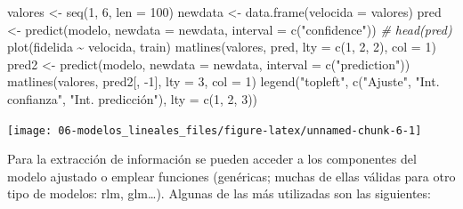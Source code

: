 \documentclass[
  spanish,
]{book}
\newenvironment{Shaded}{\begin{snugshade}}{\end{snugshade}}
\newcommand{\AttributeTok}[1]{\textcolor[rgb]{0.77,0.63,0.00}{#1}}
\newcommand{\CommentTok}[1]{\textcolor[rgb]{0.56,0.35,0.01}{\textit{#1}}}
\newcommand{\DecValTok}[1]{\textcolor[rgb]{0.00,0.00,0.81}{#1}}
\newcommand{\FunctionTok}[1]{\textcolor[rgb]{0.00,0.00,0.00}{#1}}
\newcommand{\NormalTok}[1]{#1}
\newcommand{\OtherTok}[1]{\textcolor[rgb]{0.56,0.35,0.01}{#1}}
\newcommand{\SpecialCharTok}[1]{\textcolor[rgb]{0.00,0.00,0.00}{#1}}
\newcommand{\StringTok}[1]{\textcolor[rgb]{0.31,0.60,0.02}{#1}}
\theoremstyle{break}
\theoremstyle{definition}
\theoremstyle{definition}
\theoremstyle{definition}
\theoremstyle{definition}
\theoremstyle{remark}
\begin{document}
\begin{Shaded}
\begin{Highlighting}[]
\NormalTok{valores }\OtherTok{\textless{}{-}} \FunctionTok{seq}\NormalTok{(}\DecValTok{1}\NormalTok{, }\DecValTok{6}\NormalTok{, }\AttributeTok{len =} \DecValTok{100}\NormalTok{)}
\NormalTok{newdata }\OtherTok{\textless{}{-}} \FunctionTok{data.frame}\NormalTok{(}\AttributeTok{velocida =}\NormalTok{ valores)}
\NormalTok{pred }\OtherTok{\textless{}{-}} \FunctionTok{predict}\NormalTok{(modelo, }\AttributeTok{newdata =}\NormalTok{ newdata, }\AttributeTok{interval =} \FunctionTok{c}\NormalTok{(}\StringTok{"confidence"}\NormalTok{))}
\CommentTok{\# head(pred)}
\FunctionTok{plot}\NormalTok{(fidelida }\SpecialCharTok{\textasciitilde{}}\NormalTok{ velocida, train)}
\FunctionTok{matlines}\NormalTok{(valores, pred, }\AttributeTok{lty =} \FunctionTok{c}\NormalTok{(}\DecValTok{1}\NormalTok{, }\DecValTok{2}\NormalTok{, }\DecValTok{2}\NormalTok{), }\AttributeTok{col =} \DecValTok{1}\NormalTok{)}
\NormalTok{pred2 }\OtherTok{\textless{}{-}} \FunctionTok{predict}\NormalTok{(modelo, }\AttributeTok{newdata =}\NormalTok{ newdata, }\AttributeTok{interval =} \FunctionTok{c}\NormalTok{(}\StringTok{"prediction"}\NormalTok{))}
\FunctionTok{matlines}\NormalTok{(valores, pred2[, }\SpecialCharTok{{-}}\DecValTok{1}\NormalTok{], }\AttributeTok{lty =} \DecValTok{3}\NormalTok{, }\AttributeTok{col =} \DecValTok{1}\NormalTok{)}
\FunctionTok{legend}\NormalTok{(}\StringTok{"topleft"}\NormalTok{, }\FunctionTok{c}\NormalTok{(}\StringTok{"Ajuste"}\NormalTok{, }\StringTok{"Int. confianza"}\NormalTok{, }\StringTok{"Int. predicción"}\NormalTok{), }\AttributeTok{lty =} \FunctionTok{c}\NormalTok{(}\DecValTok{1}\NormalTok{, }\DecValTok{2}\NormalTok{, }\DecValTok{3}\NormalTok{))}
\end{Highlighting}
\end{Shaded}

\begin{center}\texttt{[image: 06-modelos\_lineales\_files/figure-latex/unnamed-chunk-6-1]} \end{center}

Para la extracción de información se pueden acceder a los componentes del modelo ajustado o emplear funciones (genéricas; muchas de ellas válidas para otro tipo de modelos: rlm, glm\ldots).
Algunas de las más utilizadas son las siguientes:
\end{document}
